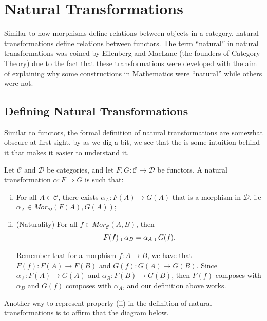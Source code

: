 \section{Natural Transformations}

Similar to how morphisms define relations between objects in a category, natural transformations
define relations between functors.
The term ``natural'' in natural transformations was coined by Eilenberg and MacLane (the founders
of Category Theory) due to the fact that these transformations were developed with the
aim of explaining why some constructions in Mathematics were ``natural'' while others
were not.


\subsection{Defining Natural Transformations}

Similar to functors, the formal definition of natural transformations
are somewhat obscure at first sight, by as we dig a bit, we see that the is
some intuition behind it that makes it easier to understand it.

\begin{definition}
  Let $\mathcal C$ and $\mathcal D$ be categories, and let $F,G:\mathcal C \to \mathcal D$ be functors.
  A natural transformation $\alpha: F \Rightarrow G$ is such that:
  \begin{enumerate}[(i)]
    \item For all $A \in \mathcal C$, there exists $\alpha_A :F(A) \to G(A)$ that is
      a morphism in $\mathcal D$, i.e $\alpha_A \in Mor_\mathcal D (F(A), G(A))$;
    \item (Naturality) For all $f \in Mor_\mathcal C (A,B)$, then
      \begin{displaymath}
        F(f)\fatsemi \alpha_B = \alpha_A \fatsemi G(f).
      \end{displaymath}

    Remember that for a morphism $f:A \to B$, we have that $F(f):F(A)\to F(B)$ and $G(f):G(A) \to G(B)$.
    Since $\alpha_A: F(A) \to G(A)$ and $\alpha_B : F(B) \to G(B)$, then $F(f)$ composes
    with $\alpha_B$ and $G(f)$ composes with $\alpha_A$, and our definition above works.
  \end{enumerate}
  \label{def:NaturalTransformation}
\end{definition}

Another way to represent property (ii) in the definition of natural transformations
is to affirm that the diagram below.

